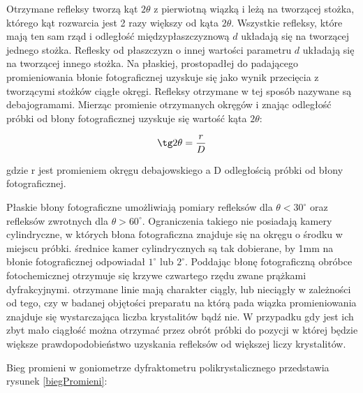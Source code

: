 \documentclass[a4paper,12pt]{article}
\numberwithin{equation}{section}
\begin{document}
Otrzymane refleksy tworzą kąt $2\theta$ z pierwiotną wiązką i leżą na tworzącej stożka, którego kąt rozwarcia jest 2 razy większy 
od kąta $2\theta$. Wszystkie refleksy, które mają ten sam rząd i odległość międzypłaszczyznową $d$ układają się na tworzącej 
jednego stożka. Reflesky od płaszczyzn o innej wartości parametru $d$ układają się na tworzącej innego stożka. Na płaskiej, 
prostopadłej do padającego promieniowania błonie fotograficznej uzyskuje się jako wynik przecięcia z tworzącymi stożków ciągłe 
okręgi. Refleksy otrzymane w tej sposób nazywane są debajogramami. Mierząc promienie otrzymanych okręgów i znając odległość 
próbki od błony fotograficznej uzyskuje się wartość kąta $2\theta$:

   \begin{equation}
    \tg2\theta= \frac{r}{D}
    \label{eq:bragg}
  \end{equation}

gdzie r jest promieniem okręgu debajowskiego a D odległością próbki od błony fotograficznej.

Płaskie błony fotograficzne umożliwiają pomiary refleksów dla $\theta < 30^{\circ}$ oraz refleksów zwrotnych dla
$\theta > 60^{\circ}$. Ograniczenia takiego nie posiadają kamery cylindryczne, w których błona fotograficzna znajduje się na 
okręgu o środku w miejscu próbki. średnice kamer cylindrycznych są tak dobierane, by 1mm na błonie fotograficznej odpowiadał 
$1^{\circ}$ lub $2^{\circ}$. Poddając błonę fotograficzną obróbce fotochemicznej otrzymuje się krzywe czwartego rzędu
zwane prążkami dyfrakcyjnymi. otrzymane linie mają charakter ciągly, lub nieciągły w zależności od tego, czy w badanej objętości 
preparatu na którą pada wiązka promieniowania znajduje się wystarczająca liczba krystalitów bądź nie. W przypadku gdy jest ich
zbyt mało ciągłość można otrzymać przez obrót próbki do pozycji w której będzie większe prawdopodobieństwo uzyskania refleksów od większej liczy krystalitów.

Bieg promieni w goniometrze dyfraktometru polikrystalicznego przedstawia rysunek \ref{biegPromieni}:
\end{document}
